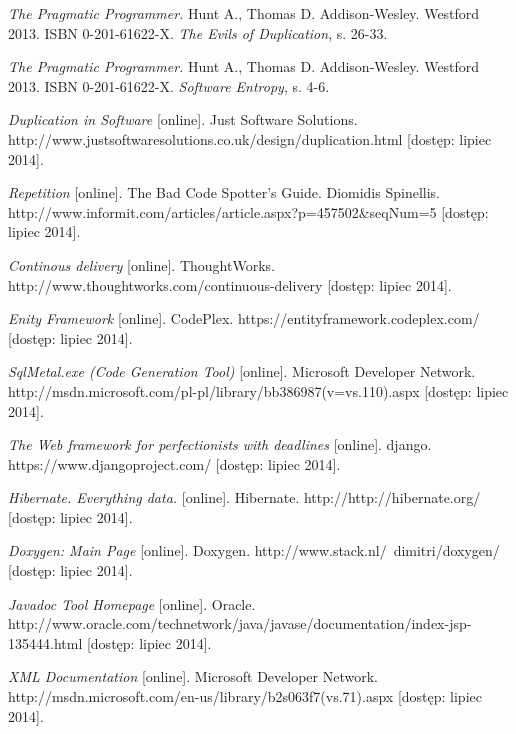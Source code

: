 \begin{thebibliography}{}

  \emph{The Pragmatic Programmer.}
  Hunt A., Thomas D.
  Addison-Wesley.
  Westford 2013.
  ISBN 0-201-61622-X.
  \emph{The Evils of Duplication}, s. 26-33.
 
  \emph{The Pragmatic Programmer.}
  Hunt A., Thomas D.
  Addison-Wesley.
  Westford 2013.
  ISBN 0-201-61622-X.
  \emph{Software Entropy}, s. 4-6.
 
  \emph{Duplication in Software} [online].
  Just Software Solutions.
  http://www.justsoftwaresolutions.co.uk/design/duplication.html [dostęp: lipiec 2014].
  
  \emph{Repetition} [online].
  The Bad Code Spotter's Guide.
  Diomidis Spinellis.
  http://www.informit.com/articles/article.aspx?p=457502\&seqNum=5 [dostęp: lipiec 2014].
 
  \emph{Continous delivery} [online].
  ThoughtWorks.
  http://www.thoughtworks.com/continuous-delivery [dostęp: lipiec 2014].
 
  \emph{Enity Framework} [online].
  CodePlex.
  https://entityframework.codeplex.com/ [dostęp: lipiec 2014].
 
  \emph{SqlMetal.exe (Code Generation Tool)} [online].
  Microsoft Developer Network.
  http://msdn.microsoft.com/pl-pl/library/bb386987(v=vs.110).aspx [dostęp: lipiec 2014].
 
  \emph{The Web framework for perfectionists with deadlines} [online].
  django.
  https://www.djangoproject.com/ [dostęp: lipiec 2014].
  
  \emph{Hibernate. Everything data.} [online].
  Hibernate.
  http://http://hibernate.org/ [dostęp: lipiec 2014].
  
  \emph{Doxygen: Main Page} [online].
  Doxygen.
  http://www.stack.nl/~dimitri/doxygen/ [dostęp: lipiec 2014].
  
  \emph{Javadoc Tool Homepage} [online].
  Oracle.
  http://www.oracle.com/technetwork/java/javase/documentation/index-jsp-135444.html [dostęp: lipiec 2014].
  
  \emph{XML Documentation} [online].
  Microsoft Developer Network.
  http://msdn.microsoft.com/en-us/library/b2s063f7(vs.71).aspx [dostęp: lipiec 2014].
  

\end{thebibliography}
